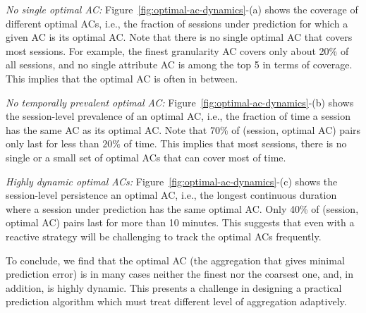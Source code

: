  
\begin{packeditemize}
	\item {\it No single optimal AC:} Figure~\ref{fig:optimal-ac-dynamics}-(a) shows the coverage of different optimal ACs, i.e., the fraction of sessions under prediction for which a given AC is its optimal AC. Note that there is no single optimal AC that covers most sessions. For example, the finest granularity AC covers only about 20\% of all sessions, and no single attribute AC is among the top 5 in terms of coverage. This implies that the optimal AC is often in between.
	\item {\it No temporally prevalent optimal AC:} Figure~\ref{fig:optimal-ac-dynamics}-(b) shows the session-level prevalence of an optimal AC, i.e., the fraction of time a session has the same AC as its optimal AC. Note that $70\%$ of (session, optimal AC) pairs only last for less than $20\%$ of time. This implies that most sessions, there is no single or a small set of optimal ACs that can cover most of time.
	\item {\it Highly dynamic optimal ACs:} Figure~\ref{fig:optimal-ac-dynamics}-(c) shows the session-level persistence an optimal AC, i.e., the longest continuous duration where a session under prediction has the same optimal AC. Only 40\% of (session, optimal AC) pairs last for more than 10 minutes. This suggests that even with a reactive strategy will be challenging to track the optimal ACs frequently.
\end{packeditemize}

To conclude, we find that the optimal AC (the aggregation that gives minimal prediction error) is in many cases neither the finest nor the coarsest one, and, in addition, is highly dynamic. This presents a challenge in designing a practical prediction algorithm which must treat different level of aggregation adaptively.


